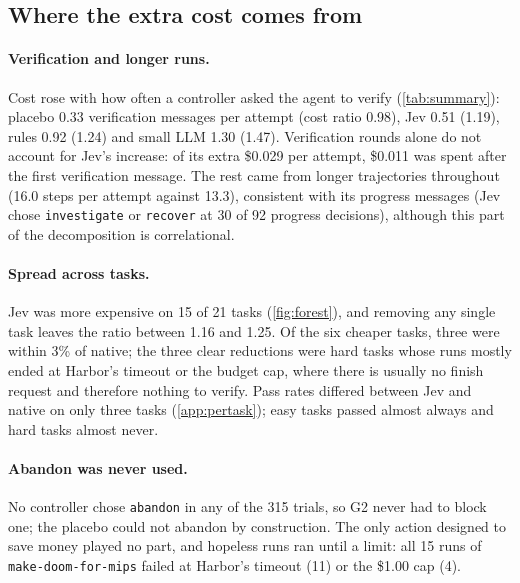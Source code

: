 \documentclass[10pt]{article}
\begin{document}
\begin{table}[t]
  \centering
  \caption{Offline decision quality on states logged by native in the evaluation, labelled with the trial outcome. Accuracy is that of the argmax choice; no controller answer fell back.}
  \label{tab:offline}
  
\end{table}

\subsection{Where the extra cost comes from}
\label{sec:mechanism}

\paragraph{Verification and longer runs.}
Cost rose with how often a controller asked the agent to verify (\cref{tab:summary}): placebo 0.33 verification messages per attempt (cost ratio 0.98), Jev 0.51 (1.19), rules 0.92 (1.24) and small LLM 1.30 (1.47).
Verification rounds alone do not account for Jev's increase: of its extra \$0.029 per attempt, \$0.011 was spent after the first verification message.
The rest came from longer trajectories throughout (16.0 steps per attempt against 13.3), consistent with its progress messages (Jev chose \texttt{investigate} or \texttt{recover} at 30 of 92 progress decisions), although this part of the decomposition is correlational.

\paragraph{Spread across tasks.}
Jev was more expensive on 15 of 21 tasks (\cref{fig:forest}), and removing any single task leaves the ratio between 1.16 and 1.25.
Of the six cheaper tasks, three were within 3\% of native; the three clear reductions were hard tasks whose runs mostly ended at Harbor's timeout or the budget cap, where there is usually no finish request and therefore nothing to verify.
Pass rates differed between Jev and native on only three tasks (\cref{app:pertask}); easy tasks passed almost always and hard tasks almost never.

\paragraph{Abandon was never used.}
No controller chose \texttt{abandon} in any of the 315 trials, so G2 never had to block one; the placebo could not abandon by construction.
The only action designed to save money played no part, and hopeless runs ran until a limit: all 15 runs of \texttt{make-doom-for-mips} failed at Harbor's timeout (11) or the \$1.00 cap (4).
\end{document}
